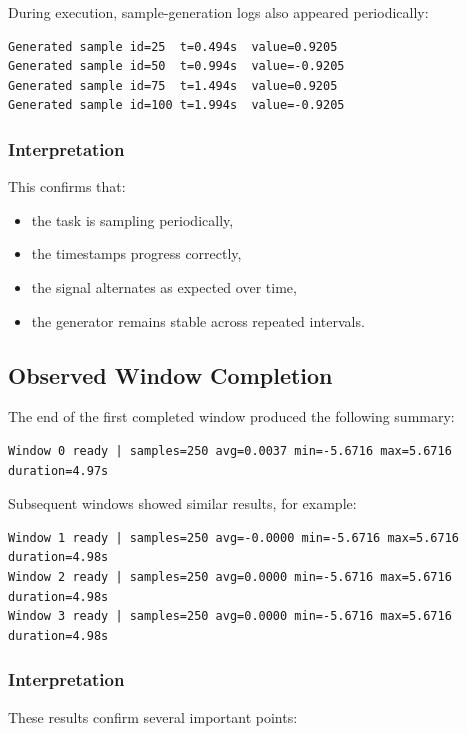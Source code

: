 \documentclass[12pt,a4paper]{article}
\begin{document}
During execution, sample-generation logs also appeared periodically:

\begin{lstlisting}
Generated sample id=25  t=0.494s  value=0.9205
Generated sample id=50  t=0.994s  value=-0.9205
Generated sample id=75  t=1.494s  value=0.9205
Generated sample id=100 t=1.994s  value=-0.9205
\end{lstlisting}

\subsubsection*{Interpretation}

This confirms that:

\begin{itemize}
    \item the task is sampling periodically,
    \item the timestamps progress correctly,
    \item the signal alternates as expected over time,
    \item the generator remains stable across repeated intervals.
\end{itemize}

\subsection{Observed Window Completion}

The end of the first completed window produced the following summary:

\begin{lstlisting}
Window 0 ready | samples=250 avg=0.0037 min=-5.6716 max=5.6716 duration=4.97s
\end{lstlisting}

Subsequent windows showed similar results, for example:

\begin{lstlisting}
Window 1 ready | samples=250 avg=-0.0000 min=-5.6716 max=5.6716 duration=4.98s
Window 2 ready | samples=250 avg=0.0000 min=-5.6716 max=5.6716 duration=4.98s
Window 3 ready | samples=250 avg=0.0000 min=-5.6716 max=5.6716 duration=4.98s
\end{lstlisting}

\subsubsection*{Interpretation}

These results confirm several important points:
\end{document}
